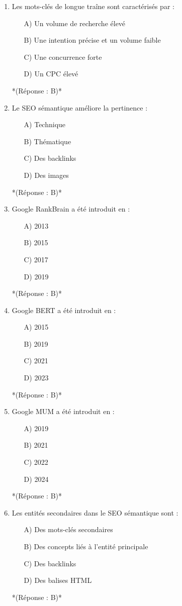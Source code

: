 \documentclass[12pt,a4paper,twoside]{report}
\begin{document}
\begin{enumerate}
\item Les mots-clés de longue traîne sont caractérisés par :
\begin{itemize}
\item[A)] Un volume de recherche élevé
\item[B)] Une intention précise et un volume faible
\item[C)] Une concurrence forte
\item[D)] Un CPC élevé
\end{itemize}
*(Réponse : B)*

\item Le SEO sémantique améliore la pertinence :
\begin{itemize}
\item[A)] Technique
\item[B)] Thématique
\item[C)] Des backlinks
\item[D)] Des images
\end{itemize}
*(Réponse : B)*

\item Google RankBrain a été introduit en :
\begin{itemize}
\item[A)] 2013
\item[B)] 2015
\item[C)] 2017
\item[D)] 2019
\end{itemize}
*(Réponse : B)*

\item Google BERT a été introduit en :
\begin{itemize}
\item[A)] 2015
\item[B)] 2019
\item[C)] 2021
\item[D)] 2023
\end{itemize}
*(Réponse : B)*

\item Google MUM a été introduit en :
\begin{itemize}
\item[A)] 2019
\item[B)] 2021
\item[C)] 2022
\item[D)] 2024
\end{itemize}
*(Réponse : B)*

\item Les entités secondaires dans le SEO sémantique sont :
\begin{itemize}
\item[A)] Des mots-clés secondaires
\item[B)] Des concepts liés à l'entité principale
\item[C)] Des backlinks
\item[D)] Des balises HTML
\end{itemize}
*(Réponse : B)*


\end{enumerate}
\end{document}
